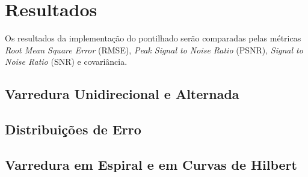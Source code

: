 \section{Resultados}

Os resultados da implementação do pontilhado serão comparadas pelas métricas \textit{Root Mean Square Error} (RMSE), \textit{Peak Signal to Noise Ratio} (PSNR), \textit{Signal to Noise Ratio} (SNR) e covariância.

\subsection{Varredura Unidirecional e Alternada}
    {}

\subsection{Distribuições de Erro}
    

\subsection{Varredura em Espiral e em Curvas de Hilbert}
    
